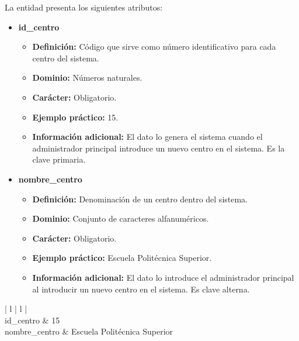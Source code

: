 \begin{description}
   \item[Descripción de los atributos] La entidad presenta los siguientes
   atributos:

   \begin{itemize}
    \item \textbf{id\_centro}
      \begin{itemize}
         \item \textbf{Definición:} Código que sirve como número identificativo
               para cada centro del sistema.
         \item \textbf{Dominio:} Números naturales.
         \item \textbf{Carácter:} Obligatorio.
         \item \textbf{Ejemplo práctico:} 15.
         \item \textbf{Información adicional:} El dato lo genera el sistema
               cuando el administrador principal introduce un nuevo centro en
               el sistema. Es la clave primaria.
      \end{itemize}
   \item \textbf{nombre\_centro}
      \begin{itemize}
         \item \textbf{Definición:} Denominación de un centro dentro del sistema.
         \item \textbf{Dominio:} Conjunto de caracteres alfanuméricos.
         \item \textbf{Carácter:} Obligatorio.
         \item \textbf{Ejemplo práctico:} Escuela Politécnica Superior.
         \item \textbf{Información adicional:} El dato lo introduce el
         administrador principal al introducir un nuevo centro en el sistema. Es
         clave alterna.
      \end{itemize}
   \end{itemize}

   \item[Ejemplo práctico]

   \item \begin{center}
            \begin{tabular}{ | l | l | }
            \hline
             \\
            \hline
            id\_centro & 15 \\
            \hline
            nombre\_centro & Escuela Politécnica Superior \\
            \hline
            \end{tabular}
         \end{center}
   \end{description}
